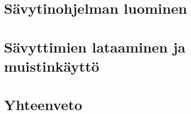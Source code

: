 \documentclass[finnish]{tktltiki2}
\theoremstyle{definition}
\theoremstyle{remark}
\begin{document}
\section{Sävytinohjelman luominen}

\section{Sävyttimien lataaminen ja muistinkäyttö}

\section{Yhteenveto}


%
%
% 
%

%






% 
\end{document}
